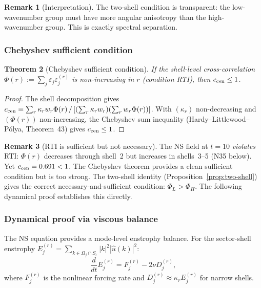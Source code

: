 \documentclass[11pt]{article}
\newtheorem{theorem}{Theorem}[section]
\theoremstyle{definition}
\newtheorem{remark}[theorem]{Remark}
\begin{document}
\begin{remark}[Interpretation]
The two-shell condition is transparent: the
low-wavenumber group must have more angular
anisotropy than the high-wavenumber group.
This is exactly spectral separation.
\end{remark}

\subsubsection{Chebyshev sufficient condition}

\begin{theorem}[Chebyshev sufficient condition]
\label{thm:centroid}
If the shell-level cross-correlation
$\Phi(r) := \sum_j\varepsilon_j\varepsilon_j^{(r)}$
is non-increasing in $r$ (condition RTI), then
$c_{\rm cen}\leq 1$.
\end{theorem}

\begin{proof}
The shell decomposition gives
$c_{\rm cen} = \sum_r\kappa_r w_r\Phi(r)\,/\,
[(\sum_r\kappa_r w_r)(\sum_r w_r\Phi(r))]$.
With $(\kappa_r)$ non-decreasing and $(\Phi(r))$
non-increasing, the Chebyshev sum inequality
(Hardy--Littlewood--P\'olya, Theorem~43) gives
$c_{\rm cen}\leq 1$.
\end{proof}

\begin{remark}[RTI is sufficient but not necessary]
\label{rem:RTI-not-necessary}
The NS field at $t=10$ \emph{violates} RTI:
$\Phi(r)$ decreases through shell~2 but increases
in shells~3--5 (N35 below).  Yet $c_{\rm cen}=0.691<1$.
The Chebyshev theorem provides a clean sufficient
condition but is too strong.  The two-shell identity
(Proposition~\ref{prop:two-shell}) gives the correct
necessary-and-sufficient condition: $\Phi_L>\Phi_H$.
The following dynamical proof establishes this directly.
\end{remark}

\subsubsection{Dynamical proof via viscous balance}

The NS equation provides a mode-level enstrophy
balance.  For the sector-shell enstrophy
$E_j^{(r)} = \sum_{k\in\Omega_j\cap S_r}
|k|^2|\hat u(k)|^2$:
\begin{equation}\label{eq:Ej-evolution}
\frac{d}{dt}E_j^{(r)} = F_j^{(r)}
- 2\nu D_j^{(r)},
\end{equation}
where $F_j^{(r)}$ is the nonlinear forcing rate
and $D_j^{(r)}\approx\kappa_r E_j^{(r)}$ for
narrow shells.
\end{document}
